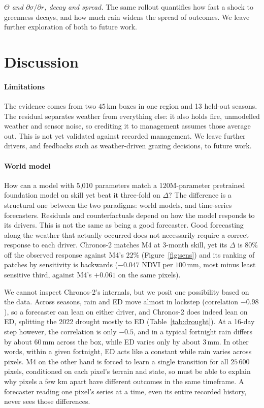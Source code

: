 \documentclass[letterpaper]{article} %
\begin{document}
\textit{$\Theta$ and $\partial\sigma/\partial r$, decay and spread.} The same rollout quantifies how fast a shock to greenness decays, and how much rain widens the spread of outcomes. We leave further exploration of both to future work.

\section{Discussion}

\paragraph{Limitations} The evidence comes from two $45$\,km boxes in one region and 13 held-out seasons. The residual separates weather from everything else: it also holds fire, unmodelled weather and sensor noise, so crediting it to management assumes those average out. This is not yet validated against recorded management. We leave further drivers, and feedbacks such as weather-driven grazing decisions, to future work.

\paragraph{World model} How can a model with 5,010 parameters match a 120M-parameter pretrained foundation model on skill yet beat it three-fold on $\Delta$? The difference is a structural one between the two paradigms: world models, and time-series forecasters. Residuals and counterfactuals depend on how the model responds to its drivers. This is not the same as being a good forecaster. Good forecasting along the weather that actually occurred does not necessarily require a correct response to each driver. Chronos-2 matches M4 at 3-month skill, yet its $\Delta$ is $80\%$ off the observed response against M4's $22\%$ (Figure~\ref{fig:sens}) and its ranking of patches by sensitivity is backwards ($-0.047$ NDVI per $100$\,mm, most minus least sensitive third, against M4's $+0.061$ on the same pixels).

We cannot inspect Chronos-2's internals, but we posit one possibility based on the data. Across seasons, rain and ED move almost in lockstep (correlation $-0.98$), so a forecaster can lean on either driver, and Chronos-2 does indeed lean on ED, splitting the 2022 drought mostly to ED (Table~\ref{tab:drought}). At a 16-day step however, the correlation is only $-0.5$, and in a typical fortnight rain differs by about $60$\,mm across the box, while ED varies only by about $3$\,mm. In other words, within a given fortnight, ED acts like a constant while rain varies across pixels. M4 on the other hand is forced to learn a single transition for all $25\,600$ pixels, conditioned on each pixel's terrain and state, so must be able to explain why pixels a few km apart have different outcomes in the same timeframe. A forecaster reading one pixel's series at a time, even its entire recorded history, never sees those differences.
\end{document}
